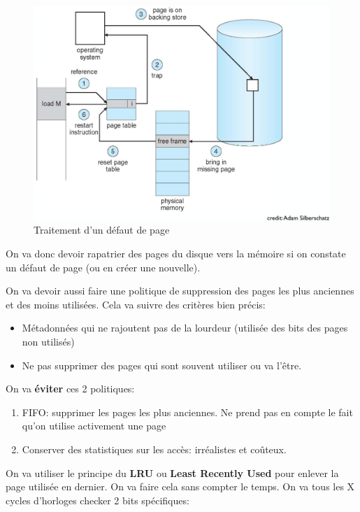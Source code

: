\begin{figure}
\centering
\includegraphics{image-58.png}
\caption{Traitement d'un défaut de page}
\end{figure}

On va donc devoir rapatrier des pages du disque vers la mémoire si on
constate un défaut de page (ou en créer une nouvelle).

On va devoir aussi faire une politique de suppression des pages les plus
anciennes et des moins utilisées. Cela va suivre des critères bien
précis:

\begin{itemize}
\tightlist
\item
  Métadonnées qui ne rajoutent pas de la lourdeur (utilisée des bits des
  pages non utilisés)
\item
  Ne pas supprimer des pages qui sont souvent utiliser ou va l'être.
\end{itemize}

On va \textbf{éviter} ces 2 politiques:

\begin{enumerate}
\def\labelenumi{\arabic{enumi}.}
\tightlist
\item
  FIFO: supprimer les pages les plus anciennes. Ne prend pas en compte
  le fait qu'on utilise activement une page
\item
  Conserver des statistiques sur les accès: irréalistes et coûteux.
\end{enumerate}

On va utiliser le principe du \textbf{LRU} ou \textbf{Least Recently
Used} pour enlever la page utilisée en dernier. On va faire cela sans
compter le temps. On va tous les X cycles d'horloges checker 2 bits
spécifiques:

